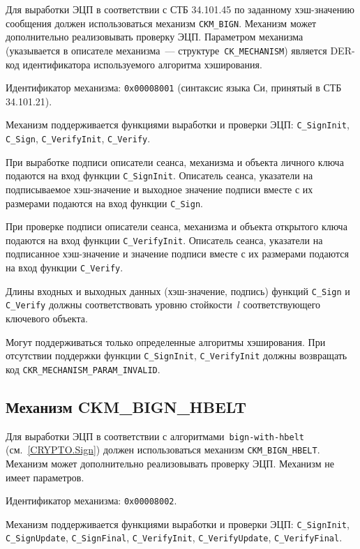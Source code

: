 Для выработки ЭЦП в соответствии с СТБ 34.101.45 по заданному хэш-значению 
сообщения должен использоваться механизм \verb|CKM_BIGN|. Механизм может 
дополнительно реализовывать проверку ЭЦП. 
%
Параметром механизма (указывается в описателе механизма~--- 
структуре~\verb|CK_MECHANISM|) является DER-код идентификатора 
используемого алгоритма хэширования.

Идентификатор механизма: \texttt{0x00008001} 
(синтаксис языка Си, принятый в СТБ 34.101.21). 

Механизм поддерживается функциями выработки и проверки ЭЦП: 
\verb|C_SignInit|, \verb|C_Sign|, \verb|C_VerifyInit|, \verb|C_Verify|.

При выработке подписи описатели сеанса, механизма и объекта
личного ключа подаются на вход функции \verb|C_SignInit|.
Описатель сеанса, указатели на подписываемое хэш-значение и выходное 
значение подписи вместе с их размерами подаются на вход функции 
\verb|C_Sign|.

При проверке подписи описатели сеанса, механизма и объекта
открытого ключа подаются на вход функции \verb|C_VerifyInit|.
Описатель сеанса, указатели на подписанное хэш-значение и значение подписи 
вместе с их размерами подаются на вход функции \verb|C_Verify|.

Длины входных и выходных данных (хэш-значение, подпись) функций
\verb|C_Sign| и \verb|C_Verify| должны соответствовать
уровню стойкости~$l$ соответствующего ключевого объекта.

Могут поддерживаться только определенные алгоритмы хэширования.
При отсутствии поддержки функции \verb|C_SignInit|,
\verb|C_VerifyInit| должны возвращать код 
\verb|CKR_MECHANISM_PARAM_INVALID|.

\subsection{Механизм CKM\_BIGN\_HBELT}\label{CRYPTOKI.SignHBelt}

Для выработки ЭЦП в соответствии с алгоритмами~\texttt{bign-with-hbelt} 
(см.~\ref{CRYPTO.Sign}) должен использоваться механизм \verb|CKM_BIGN_HBELT|. 
Механизм может дополнительно реализовывать проверку ЭЦП. 
%
Механизм не имеет параметров.

Идентификатор механизма: \texttt{0x00008002}.

Механизм поддерживается функциями выработки и проверки ЭЦП: 
\verb|C_SignInit|, \verb|C_SignUpdate|, \verb|C_SignFinal|, 
\verb|C_VerifyInit|, \verb|C_VerifyUpdate|, \verb|C_VerifyFinal|.

